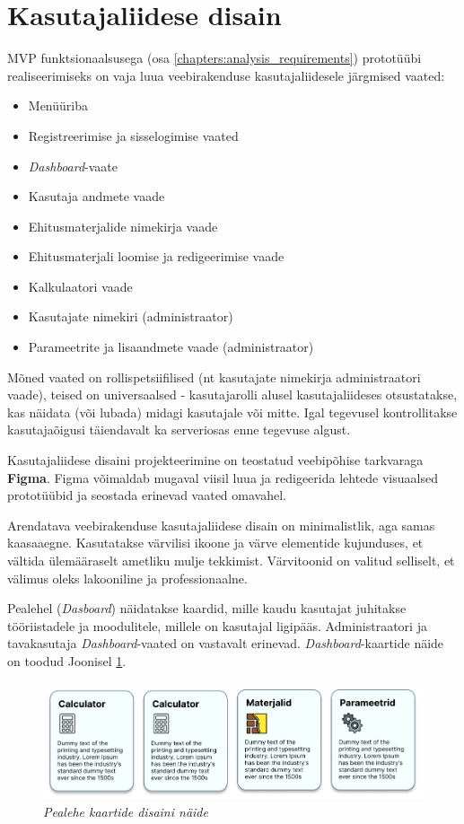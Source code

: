\section{Kasutajaliidese disain}
\label{chapters:analysis_interface_design}
MVP funktsionaalsusega (osa \ref{chapters:analysis_requirements}) prototüübi  realiseerimiseks on vaja luua
veebirakenduse kasutajaliidesele järgmised vaated:
\begin{itemize}
    \item Menüüriba
    \item Registreerimise ja sisselogimise vaated
    \item \textit{Dashboard}-vaate
    \item Kasutaja andmete vaade
    \item Ehitusmaterjalide nimekirja vaade
    \item Ehitusmaterjali loomise ja redigeerimise vaade
    \item Kalkulaatori vaade
    \item Kasutajate nimekiri (administraator)
    \item Parameetrite ja lisaandmete vaade (administraator)
\end{itemize}

Mõned vaated on rollispetsiifilised (nt kasutajate nimekirja administraatori vaade), teised on universaalsed - 
kasutajarolli alusel kasutajaliideses otsustatakse, kas näidata (või lubada) midagi kasutajale või mitte.
Igal tegevusel kontrollitakse kasutajaõigusi täiendavalt ka serveriosas enne tegevuse algust.

Kasutajaliidese disaini projekteerimine on teostatud veebipõhise tarkvaraga \textbf{Figma}. Figma võimaldab 
mugaval viisil luua ja redigeerida lehtede visuaalsed prototüübid ja seostada erinevad vaated omavahel. 

Arendatava veebirakenduse kasutajaliidese disain on minimalistlik, aga samas kaasaaegne. Kasutatakse värvilisi ikoone ja värve
elementide kujunduses, et vältida ülemääraselt ametliku mulje tekkimist. Värvitoonid on valitud selliselt, et 
välimus oleks lakooniline ja professionaalne.

Pealehel (\textit{Dasboard}) näidatakse kaardid, mille kaudu kasutajat juhitakse tööriistadele ja 
moodulitele, millele on kasutajal ligipääs. Administraatori ja tavakasutaja \textit{Dashboard}-vaated
on vastavalt erinevad. \textit{Dashboard}-kaartide näide on toodud Joonisel \ref{fig:desing_dashboard_cards}.
\begin{figure}[ht]
    \centering
    \includegraphics[width=1\textwidth]{figures/analysis/desing_dashboard_cards.png}
    \caption[Pealehe kaartide disaini näide]{\textit{Pealehe kaartide disaini näide}}
    \label{fig:desing_dashboard_cards}
\end{figure}

